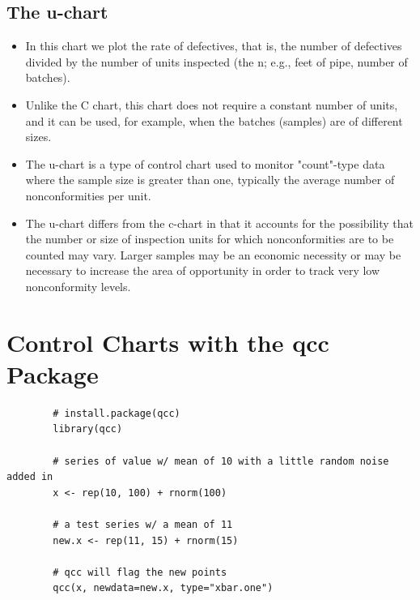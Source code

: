 \documentclass[MASTER-SPC.tex]{subfiles}
\begin{document}
\subsection{The u-chart}
\begin{itemize}
	\item In this chart we plot the rate of defectives, that is, the number of defectives divided by the number of units inspected (the n; e.g., feet of pipe, number of batches). 
	\item Unlike the C chart, this chart does not require a constant number of units, and it can be used, for example, when the batches (samples) are of different sizes.
	
	\item The u-chart is a type of control chart used to monitor "count"-type data where the sample size is greater than one, typically the average number of nonconformities per unit.
	
	\item The u-chart differs from the c-chart in that it accounts for the possibility that the number or size of inspection units for which nonconformities are to be counted may vary. Larger samples may be an economic necessity or may be necessary to increase the area of opportunity in order to track very low nonconformity levels.
\end{itemize}


\section{Control Charts with the qcc Package}
\newpage
{
	\large
	\begin{framed}
		\begin{verbatim}
		# install.package(qcc)
		library(qcc)
		
		# series of value w/ mean of 10 with a little random noise added in
		x <- rep(10, 100) + rnorm(100)
		
		# a test series w/ a mean of 11
		new.x <- rep(11, 15) + rnorm(15)
		
		# qcc will flag the new points
		qcc(x, newdata=new.x, type="xbar.one")
		\end{verbatim}
	\end{framed}
}
\end{document}
